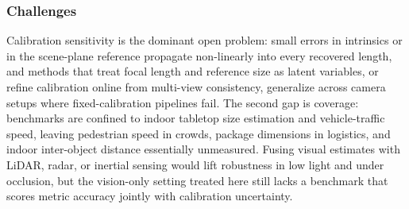 \subsubsection{Challenges}
Calibration sensitivity is the dominant open problem: small errors in intrinsics or in the scene-plane reference propagate non-linearly into every recovered length, and methods that treat focal length and reference size as latent variables, or refine calibration online from multi-view consistency, generalize across camera setups where fixed-calibration pipelines fail. The second gap is coverage: benchmarks are confined to indoor tabletop size estimation and vehicle-traffic speed, leaving pedestrian speed in crowds, package dimensions in logistics, and indoor inter-object distance essentially unmeasured. Fusing visual estimates with LiDAR, radar, or inertial sensing would lift robustness in low light and under occlusion, but the vision-only setting treated here still lacks a benchmark that scores metric accuracy jointly with calibration uncertainty.

